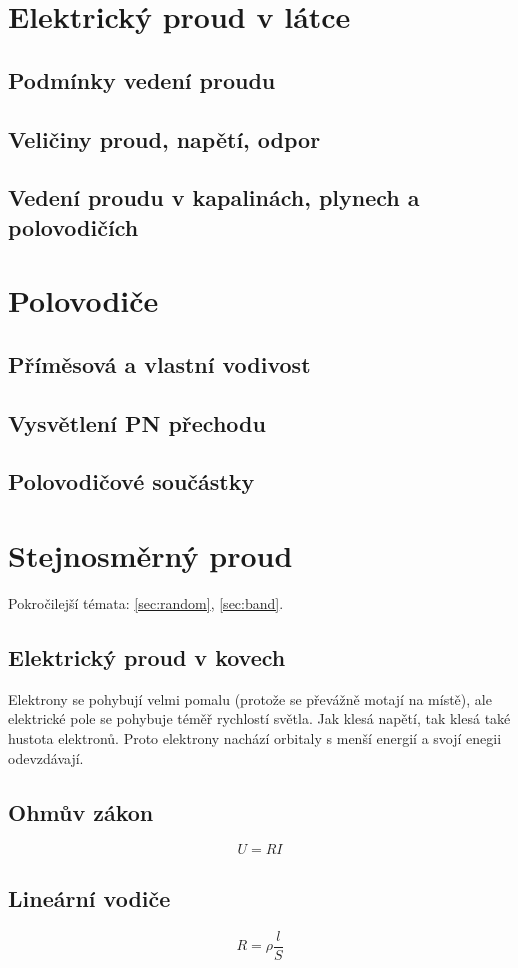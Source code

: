\documentclass[titlepage]{book}
\begin{document}
\chapter{Elektrický proud v látce}
\section{Podmínky vedení proudu}
\section{Veličiny proud, napětí, odpor}
\section{Vedení proudu v kapalinách, plynech a polovodičích}
\chapter{Polovodiče}
\section{Příměsová a vlastní vodivost}
\section{Vysvětlení PN přechodu}
\section{Polovodičové součástky}
\chapter{Stejnosměrný proud}
Pokročilejší témata: \ref{sec:random}, \ref{sec:band}.
\section{Elektrický proud v kovech}
Elektrony se pohybují velmi pomalu (protože se převážně motají na místě), ale elektrické pole se pohybuje téměř rychlostí světla. Jak klesá napětí, tak klesá také hustota elektronů. Proto elektrony nachází orbitaly s menší energií a svojí enegii odevzdávají.
\section{Ohmův zákon}
\begin{equation}
U = RI
\end{equation}
\section{Lineární vodiče}
\begin{equation}
R = \rho \frac{l}{S}
\end{equation}
\end{document}
